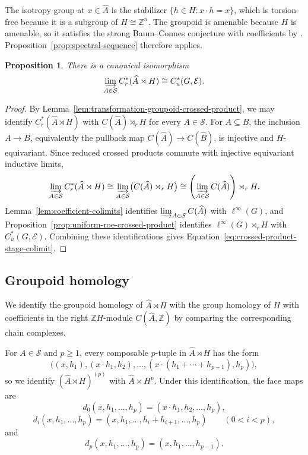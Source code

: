 \documentclass[pdflatex,sn-mathphys-num]{sn-jnl}%
\theoremstyle{plain}
\newtheorem{proposition}[theorem]{Proposition}
\theoremstyle{remark}
\theoremstyle{definition}
\numberwithin{equation}{section}
\begin{document}
The isotropy group at \( x\in\widehat A \) is the stabilizer \( \{h\in H:x\cdot h=x\} \), which is torsion-free because it is a subgroup of \( H\cong\mathbb Z^n \). The groupoid is amenable because \( H \) is amenable, so it satisfies the strong Baum--Connes conjecture with coefficients by \cite[Corollary~3.15 and the subsequent paragraph]{bonicke2024categorical}. Proposition~\ref{prop:spectral-sequence} therefore applies.

\begin{proposition}
\label{prop:crossed-product-stage-colimit}
There is a canonical isomorphism
\begin{equation}
\label{eq:crossed-product-stage-colimit}
\varinjlim_{A\in\mathcal S}C_r^*(\widehat A\rtimes H)
\cong
C_u^*(G,\mathcal E).
\end{equation}
\end{proposition}

\begin{proof}
By Lemma~\ref{lem:transformation-groupoid-crossed-product}, we may identify \( C_r^*(\widehat A\rtimes H) \) with \( C(\widehat A)\rtimes_rH \) for every \( A\in\mathcal S \). For \( A\subseteq B \), the inclusion \( A\to B \), equivalently the pullback map \( C(\widehat A)\to C(\widehat B) \), is injective and \( H \)-equivariant. Since reduced crossed products commute with injective equivariant inductive limits,
\[
\varinjlim_{A\in\mathcal S}C_r^*(\widehat A\rtimes H)
\cong
\varinjlim_{A\in\mathcal S}\bigl(C(\widehat A)\rtimes_rH\bigr)
\cong
\left(\varinjlim_{A\in\mathcal S}C(\widehat A)\right)\rtimes_rH.
\]
Lemma~\ref{lem:coefficient-colimits} identifies \( \varinjlim_{A\in\mathcal S}C(\widehat A) \) with \( \ell^\infty(G) \), and Proposition~\ref{prop:uniform-roe-crossed-product} identifies \( \ell^\infty(G)\rtimes_rH \) with \( C_u^*(G,\mathcal E) \). Combining these identifications gives Equation~\eqref{eq:crossed-product-stage-colimit}.
\end{proof}

\subsection{Groupoid homology}

We identify the groupoid homology of \( \widehat A\rtimes H \) with the group homology of \( H \) with coefficients in the right \( \mathbb Z H \)-module \( C(\widehat A,\mathbb Z) \) by comparing the corresponding chain complexes.

For \( A\in\mathcal S \) and \( p\geq1 \), every composable \( p \)-tuple in \( \widehat A\rtimes H \) has the form
\[
\bigl(
(x,h_1),
(x\cdot h_1,h_2),
\ldots,
(x\cdot(h_1+\cdots+h_{p-1}),h_p)
\bigr),
\]
so we identify \( (\widehat A\rtimes H)^{(p)} \) with \( \widehat A\times H^p \). Under this identification, the face maps are
\[
d_0(x,h_1,\ldots,h_p)
=
(x\cdot h_1,h_2,\ldots,h_p),
\]
\[
d_i(x,h_1,\ldots,h_p)
=
(x,h_1,\ldots,h_i+h_{i+1},\ldots,h_p)
\qquad
(0<i<p),
\]
and
\[
d_p(x,h_1,\ldots,h_p)
=
(x,h_1,\ldots,h_{p-1}).
\]
\end{document}
